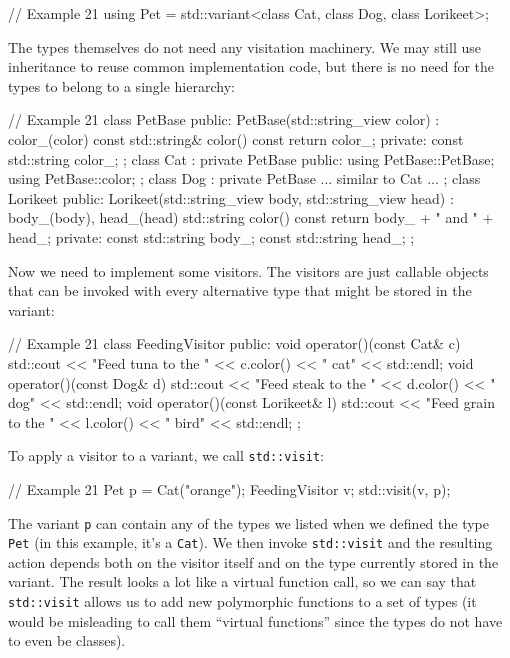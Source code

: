 \begin{code}
// Example 21
using Pet = 
  std::variant<class Cat, class Dog, class Lorikeet>;
\end{code}

The types themselves do not need any visitation machinery. We may still use inheritance to reuse common implementation code, but there is no need for the types to belong to a single hierarchy:

\begin{code}
// Example 21
class PetBase {
  public:
  PetBase(std::string_view color) : color_(color) {}
  const std::string& color() const { return color_; }
  private:
  const std::string color_;
};
class Cat : private PetBase {
  public:
  using PetBase::PetBase;
  using PetBase::color;
};
class Dog : private PetBase {
  ... similar to Cat ...
};
class Lorikeet {
  public:
  Lorikeet(std::string_view body, std::string_view head) :
    body_(body), head_(head) {}
  std::string color() const {
    return body_ + " and " + head_;
  }
  private:
  const std::string body_;
  const std::string head_;
};
\end{code}

Now we need to implement some visitors. The visitors are just callable objects that can be invoked with every alternative type that might be stored in the variant:

\begin{code}
// Example 21
class FeedingVisitor {
  public:
  void operator()(const Cat& c) {
    std::cout << "Feed tuna to the " << c.color()
              << " cat" << std::endl;
  }
  void operator()(const Dog& d) {
    std::cout << "Feed steak to the " << d.color()
              << " dog" << std::endl;
  }
  void operator()(const Lorikeet& l) {
    std::cout << "Feed grain to the " << l.color()
              << " bird" << std::endl;
  }
};
\end{code}

To apply a visitor to a variant, we call \texttt{std::visit}:

\begin{code}
// Example 21
Pet p = Cat("orange");
FeedingVisitor v;
std::visit(v, p);
\end{code}

The variant \texttt{p} can contain any of the types we listed when we defined the type \texttt{Pet} (in this example, it's a \texttt{Cat}). We then invoke \texttt{std::visit} and the resulting action depends both on the visitor itself and on the type currently stored in the variant. The result looks a lot like a virtual function call, so we can say that \texttt{std::visit} allows us to add new polymorphic functions to a set of types (it would be misleading to call them ``virtual functions'' since the types do not have to even be classes).

